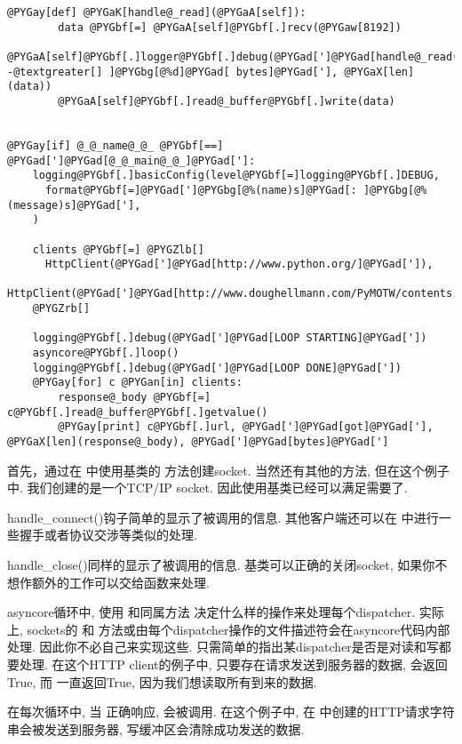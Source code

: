 \documentclass[a4paper,10pt,english]{manual}
\begin{document}
\begin{Verbatim}[commandchars=@\[\]]
    @PYGay[def] @PYGaK[handle@_read](@PYGaA[self]):
        data @PYGbf[=] @PYGaA[self]@PYGbf[.]recv(@PYGaw[8192])
        @PYGaA[self]@PYGbf[.]logger@PYGbf[.]debug(@PYGad[']@PYGad[handle@_read() -@textgreater[] ]@PYGbg[@%d]@PYGad[ bytes]@PYGad['], @PYGaX[len](data))
        @PYGaA[self]@PYGbf[.]read@_buffer@PYGbf[.]write(data)


@PYGay[if] @_@_name@_@_ @PYGbf[==] @PYGad[']@PYGad[@_@_main@_@_]@PYGad[']:
    logging@PYGbf[.]basicConfig(level@PYGbf[=]logging@PYGbf[.]DEBUG,
      format@PYGbf[=]@PYGad[']@PYGbg[@%(name)s]@PYGad[: ]@PYGbg[@%(message)s]@PYGad['],
    )

    clients @PYGbf[=] @PYGZlb[]
      HttpClient(@PYGad[']@PYGad[http://www.python.org/]@PYGad[']),
      HttpClient(@PYGad[']@PYGad[http://www.doughellmann.com/PyMOTW/contents.html]@PYGad[']),
    @PYGZrb[]

    logging@PYGbf[.]debug(@PYGad[']@PYGad[LOOP STARTING]@PYGad['])
    asyncore@PYGbf[.]loop()
    logging@PYGbf[.]debug(@PYGad[']@PYGad[LOOP DONE]@PYGad['])
    @PYGay[for] c @PYGan[in] clients:
        response@_body @PYGbf[=] c@PYGbf[.]read@_buffer@PYGbf[.]getvalue()
        @PYGay[print] c@PYGbf[.]url, @PYGad[']@PYGad[got]@PYGad['], @PYGaX[len](response@_body), @PYGad[']@PYGad[bytes]@PYGad[']
\end{Verbatim}

首先，通过在  中使用基类的  方法创建socket. 当然还有其他的方法, 但在这个例子中. 我们创建的是一个TCP/IP socket. 因此使用基类已经可以满足需要了.

handle\_connect()钩子简单的显示了被调用的信息. 其他客户端还可以在  中进行一些握手或者协议交涉等类似的处理.

handle\_close()同样的显示了被调用的信息. 基类可以正确的关闭socket, 如果你不想作额外的工作可以交给函数来处理.

asyncore循环中, 使用  和同属方法  决定什么样的操作来处理每个dispatcher. 实际上, sockets的  和  方法或由每个dispatcher操作的文件描述符会在asyncore代码内部处理. 因此你不必自己来实现这些. 只需简单的指出某dispatcher是否是对读和写都要处理. 在这个HTTP client的例子中, 只要存在请求发送到服务器的数据,  会返回True, 而  一直返回True, 因为我们想读取所有到来的数据.

在每次循环中, 当  正确响应,  会被调用. 在这个例子中, 在  中创建的HTTP请求字符串会被发送到服务器, 写缓冲区会清除成功发送的数据.
\end{document}
